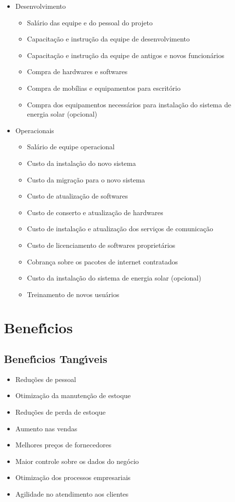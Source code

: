 \begin{itemize}
\item Desenvolvimento 
	\begin{itemize}
	\item Salário das equipe e do pessoal do projeto
	\item Capacitação e instrução da equipe de desenvolvimento 
	\item Capacitação e instrução da equipe de antigos e novos funcionários
	\item Compra de hardwares e softwares
	\item Compra de mobílias e equipamentos para escritório 
	\item Compra dos equipamentos necessários para instalação do sistema de energia solar (opcional)
	\end{itemize}
\item Operacionais
	\begin{itemize}
	\item Salário de equipe operacional 
	\item Custo da instalação do novo sistema
	\item Custo da migração para o novo sistema
	\item Custo de atualização de softwares
	\item Custo de conserto e atualização de hardwares
	\item Custo de instalação e atualização dos serviços de comunicação 
	\item Custo de licenciamento de softwares proprietários
	\item Cobrança sobre os pacotes de internet contratados
	\item Custo da instalação do sistema de energia solar (opcional)
	\item Treinamento de novos usuários
	\end{itemize}
\end{itemize}

\section{Benef\'{\i}cios}


       \subsection{Benef\'{\i}cios Tang\'{\i}veis}
       	\begin{itemize}
	\item Reduções de pessoal 
	\item Otimização da manutenção de estoque
	\item Reduções de perda de estoque %
	\item Aumento nas vendas 
	\item Melhores preços de fornecedores 
	\item Maior controle sobre os dados do negócio %
	\item Otimização dos processos empresariais 
	\item Agilidade no atendimento aos clientes
        	\end{itemize}

